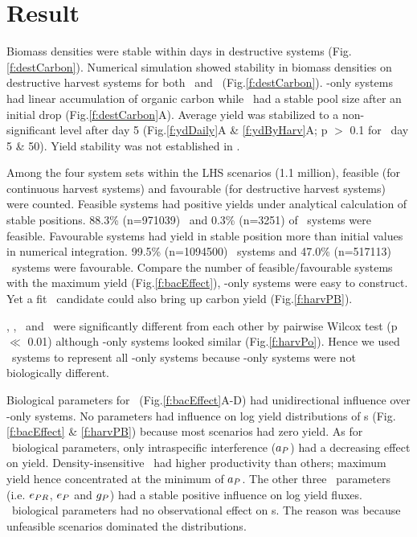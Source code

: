 \documentclass[../thesis.tex]{subfiles} %
\begin{document}
\section{Result}
Biomass densities were stable within days in destructive systems (Fig.\ref{f:destCarbon}).  
Numerical simulation showed stability in biomass densities on destructive harvest systems for both \PoN\ and \PBN\ (Fig.\ref{f:destCarbon}).  \Phy-only systems had linear accumulation of organic carbon while \pbs\ had a stable pool size after an initial drop (Fig.\ref{f:destCarbon}A).  Average yield was stabilized to a non-significant level after day 5 (Fig.\ref{f:ydDaily}A \& \ref{f:ydByHarv}A; p $>$ 0.1 for \PoN\ day 5 \& 50).  Yield stability was not established in \pbs.

Among the four system sets within the LHS scenarios (1.1 million), feasible (for continuous harvest systems) and favourable (for destructive harvest systems) were counted.  Feasible systems had positive yields under analytical calculation of stable positions.  88.3\% (n=971039) \PoH\ and 0.3\% (n=3251) of \PBH\ systems were feasible.  Favourable systems had yield in stable position more than initial values in numerical integration.  99.5\% (n=1094500) \PoN\ systems and 47.0\% (n=517113) \PBN\ systems were favourable.  Compare the number of feasible/favourable systems with the maximum yield (Fig.\ref{f:bacEffect}), \phy-only systems were easy to construct.  Yet a fit \bac\ candidate could also bring up carbon yield (Fig.\ref{f:harvPB}).

\PBH, \PoH, \PBN\ and \PoN\ were significantly different from each other by pairwise Wilcox test (p $\ll$ 0.01) although \phy-only systems looked similar (Fig.\ref{f:harvPo}).  Hence we used \PoN\ systems to represent all \phy-only systems because \phy-only systems were not biologically different.

Biological parameters for \phy\ (Fig.\ref{f:bacEffect}A-D) had unidirectional influence over \phy-only systems.  No parameters had influence on log yield distributions of \pbs s (Fig.\ref{f:bacEffect} \& \ref{f:harvPB}) because most scenarios had zero yield.   As for \phy\ biological parameters, only intraspecific interference ($a_P$) had a decreasing effect on yield.  Density-insensitive \phy\ had higher productivity than others; maximum yield hence concentrated at the minimum of $a_P$.  The other three \phy\ parameters (i.e. $e_{PR}$, $e_P$ and $g_P$) had a stable positive influence on log yield fluxes.  \Phy\ biological parameters had no observational effect on \pbs s.  The reason was because unfeasible scenarios dominated the distributions.
\end{document}
